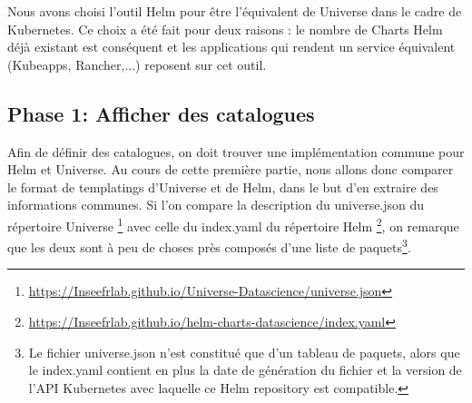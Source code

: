 \documentclass[11pt,fleqn]{book} %
\begin{document}
Nous avons choisi l'outil Helm pour être l'équivalent de Universe dans le cadre de Kubernetes. Ce choix a été fait pour deux raisons : le nombre de Charts Helm déjà existant est conséquent et les applications qui rendent un service équivalent (Kubeapps, Rancher,...) reposent sur cet outil. 
\subsection{Phase 1: Afficher des catalogues}
Afin de définir des catalogues, on doit trouver une implémentation commune pour Helm et Universe. Au cours de cette première partie, nous allons donc comparer le format de templatings d'Universe et de Helm, dans le but d'en extraire des informations communes. Si l'on compare la description du universe.json du répertoire Universe \footnote{\url{https://Inseefrlab.github.io/Universe-Datascience/universe.json}} avec celle du index.yaml du répertoire Helm \footnote{\url{https://Inseefrlab.github.io/helm-charts-datascience/index.yaml}}, on remarque que les deux sont à peu de choses près composés d'une liste de paquets\footnote{Le fichier universe.json n'est constitué que d'un tableau de paquets, alors que le index.yaml contient en plus la date de génération du fichier et la version de l'API Kubernetes avec laquelle ce Helm repository est compatible.}. \\ 
\end{document}
